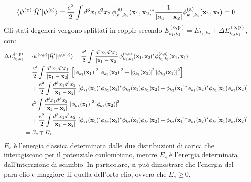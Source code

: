 \begin{equation*}
	\braket{\psi^{(\mathrm{p})} | \hat{\mathcal{H}}' | \psi^{(\mathrm{o})}} = \frac{e^2}{2} \int d^3 x_1 d^3 x_2 \, \phi^{(\mathrm{s})}_{k_1, k_2}(\mathbf{x}_1, \mathbf{x}_2)^* \frac{1}{\left\lvert\mathbf{x}_1 - \mathbf{x}_2\right\rvert} \phi^{(\mathrm{a})}_{k_1, k_2}(\mathbf{x}_1, \mathbf{x}_2) = 0
\end{equation*}
Gli stati degeneri vengono splittati in coppie secondo $ E_{k_1, k_2}^{(\mathrm{o},\mathrm{p})} = E_{k_1, k_2} + \Delta E_{k_1, k_2}^{(\mathrm{o},\mathrm{p})} $, con:
\begin{equation*}
	\begin{split}
		\Delta E_{k_1, k_2}^{(\mathrm{o},\mathrm{p})}
		&=  \braket{\psi^{(\mathrm{o},\mathrm{p})} | \hat{\mathcal{H}}' | \psi^{(\mathrm{o},\mathrm{p})}} = \frac{e^2}{2} \int \frac{d^3 x_1 d^3 x_2}{\left\lvert\mathbf{x}_1 - \mathbf{x}_2\right\rvert} \, \phi^{(\mathrm{a},\mathrm{s})}_{k_1, k_2}(\mathbf{x}_1, \mathbf{x}_2)^* \phi^{(\mathrm{a},\mathrm{s})}_{k_1, k_2}(\mathbf{x}_1, \mathbf{x}_2) \\
		&= \frac{e^2}{2} \int \frac{d^3 x_1 d^3 x_2}{\left\lvert\mathbf{x}_1 - \mathbf{x}_2\right\rvert} \, \left[ \left\lvert\phi_{k_1}(\mathbf{x}_1)\right\rvert^2 \left\lvert\phi_{k_2}(\mathbf{x}_2)\right\rvert^2 + \left\lvert\phi_{k_1}(\mathbf{x}_2)\right\rvert^2 \left\lvert\phi_{k_2}(\mathbf{x}_1)\right\rvert^2 \right] \\
		&\quad\,\, \mp \frac{e^2}{2} \int \frac{d^3 x_1 d^3 x_2}{\left\lvert\mathbf{x}_1 - \mathbf{x}_2\right\rvert} \, \left[ \phi_{k_1}(\mathbf{x}_1)^* \phi_{k_2}(\mathbf{x}_2)^* \phi_{k_2}(\mathbf{x}_1) \phi_{k_1}(\mathbf{x}_2) + \phi_{k_2}(\mathbf{x}_1)^* \phi_{k_1}(\mathbf{x}_2)^* \phi_{k_1}(\mathbf{x}_1) \phi_{k_2}(\mathbf{x}_2) \right]\\
		&= e^2 \int \frac{d^3 x_1 d^3 x_2}{\left\lvert\mathbf{x}_1 - \mathbf{x}_2\right\rvert} \, \left\lvert\phi_{k_1}(\mathbf{x}_1)\right\rvert^2 \left\lvert\phi_{k_2}(\mathbf{x}_2)\right\rvert^2 \\
		&\quad\,\, \mp \frac{e^2}{2} \int \frac{d^3 x_1 d^3 x_2}{\left\lvert\mathbf{x}_1 - \mathbf{x}_2\right\rvert} \, \left[ \phi_{k_1}(\mathbf{x}_1)^* \phi_{k_2}(\mathbf{x}_2)^* \phi_{k_2}(\mathbf{x}_1) \phi_{k_1}(\mathbf{x}_2) + \phi_{k_2}(\mathbf{x}_1)^* \phi_{k_1}(\mathbf{x}_2)^* \phi_{k_1}(\mathbf{x}_1) \phi_{k_2}(\mathbf{x}_2) \right]\\
		&\equiv E_c \mp E_s
	\end{split}
\end{equation*}
$ E_c $ è l'energia classica determinata dalle due distribuzioni di carica che interagiscono per il potenziale coulombiano, mentre $ E_s $ è l'energia determinata dall'interazione di scambio. In particolare, si può dimostrare che l'energia del para-elio è maggiore di quella dell'orto-elio, ovvero che $ E_s \ge 0 $.

